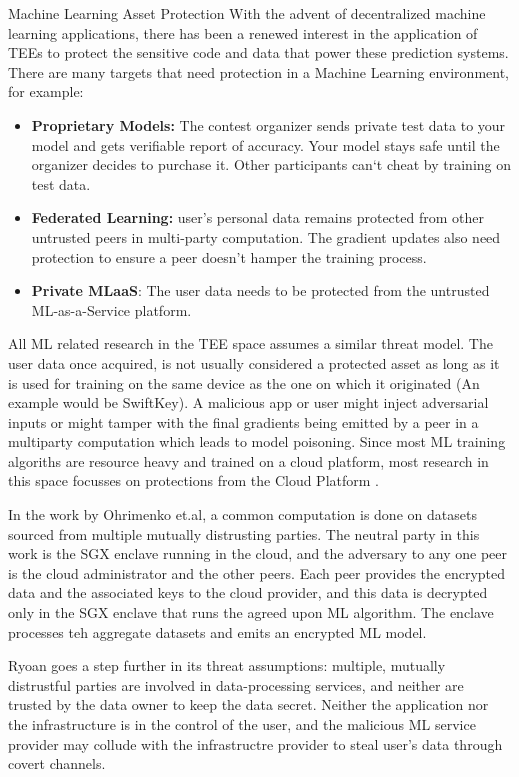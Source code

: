 \begin{subsection}{Machine Learning Asset Protection}
With the advent of decentralized machine learning applications, there has
been a renewed interest in the application of TEEs to protect the sensitive
code and data that power these prediction systems. There are many targets
that need protection in a Machine Learning environment, for example:
\begin{itemize}
    \item \textbf{Proprietary Models:} The contest organizer sends private
    test data to your model and gets verifiable report of accuracy. Your
    model stays safe until the organizer decides to purchase it. Other
    participants can‘t cheat by training on test data.
    \item \textbf{Federated Learning:} user's personal data remains
    protected from other untrusted peers in multi-party computation. The
    gradient updates also need protection to ensure a peer doesn't hamper
    the training process.
    \item \textbf{Private MLaaS}: The user data needs to be protected from
    the untrusted ML-as-a-Service platform.
\end{itemize}

All ML related research in the TEE space assumes a similar threat model. The
user data once acquired, is not usually considered a protected asset as long
as it is used for training on the same device as the one on which it
originated (An example would be SwiftKey\cite{swiftkey_support}). A
malicious app or user might inject adversarial inputs or might tamper with
the final gradients being emitted by a peer in a multiparty computation
which leads to model poisoning. Since most ML training algoriths are
resource heavy and trained on a cloud platform, most research in this space
focusses on protections from the Cloud Platform
\cite{ohrimenko2016oblivious,ryoan}. 

In the work by Ohrimenko et.al\cite{ohrimenko2016oblivious}, a common
computation is done on datasets sourced from multiple mutually distrusting
parties. The neutral party in this work is the SGX enclave running in the
cloud, and the adversary to any one peer is the cloud administrator and the
other peers. Each peer provides the encrypted data and the associated keys
to the cloud  provider, and this data is decrypted only in the SGX enclave
that runs the agreed upon ML algorithm. The enclave processes teh aggregate
datasets and emits an encrypted ML model. 

Ryoan\cite{ryoan} goes a step further in its threat assumptions: multiple,
mutually distrustful parties are involved in data-processing services, and
neither are trusted by the data owner to keep the data secret. Neither the
application nor the infrastructure is in the control of the user, and the
malicious ML service provider may collude with the infrastructre provider to
steal user's data through covert channels.


\end{subsection}
    
